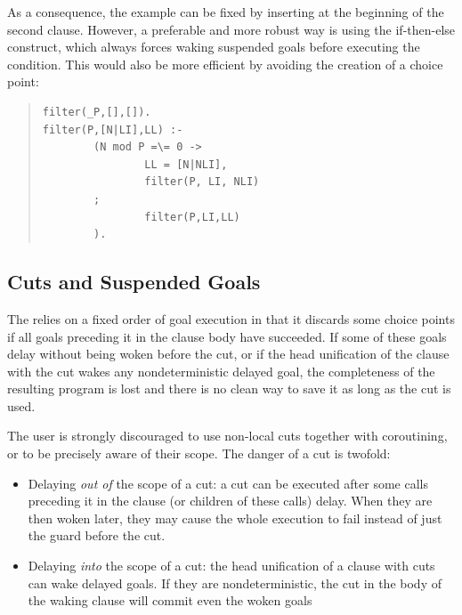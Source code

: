 As a consequence, the example can be fixed by inserting  at the
beginning of the second clause.
However, a preferable and more robust way is using the if-then-else
construct, which always forces waking suspended goals before
executing the condition.
This would also be more efficient by avoiding the creation of a choice point:
\begin{quote}
\begin{verbatim}
filter(_P,[],[]).
filter(P,[N|LI],LL) :-
        (N mod P =\= 0 ->
                LL = [N|NLI],
                filter(P, LI, NLI)
        ;
                filter(P,LI,LL)
        ).
\end{verbatim}
\end{quote}



\subsection{Cuts and Suspended Goals}
\label{delaycut}%
The
relies on a fixed order of goal execution in that it discards
some choice points if all goals preceding it in the clause body have
succeeded.
If some of these goals delay without being woken before the cut,
or if the head unification of the
clause with the cut wakes any nondeterministic delayed goal,
the completeness of the resulting program is lost
and there is no clean way to save it as long as the cut is used.

The user is strongly discouraged to use non-local cuts together with
coroutining, or to be precisely aware of their scope.
The danger of a cut is twofold:
\begin{itemize}
\item Delaying \emph{out of} the scope of a cut:
a cut can be executed after some calls preceding it in the clause
(or children of these calls) delay. When they are then woken later,
they may cause the whole execution to fail instead of just the
guard before the cut.

\item Delaying \emph{into} the scope of a cut:
the head unification of a clause with cuts can wake delayed goals.
If they are nondeterministic, the cut in the body of the waking clause
will commit even the woken goals
\end{itemize}

